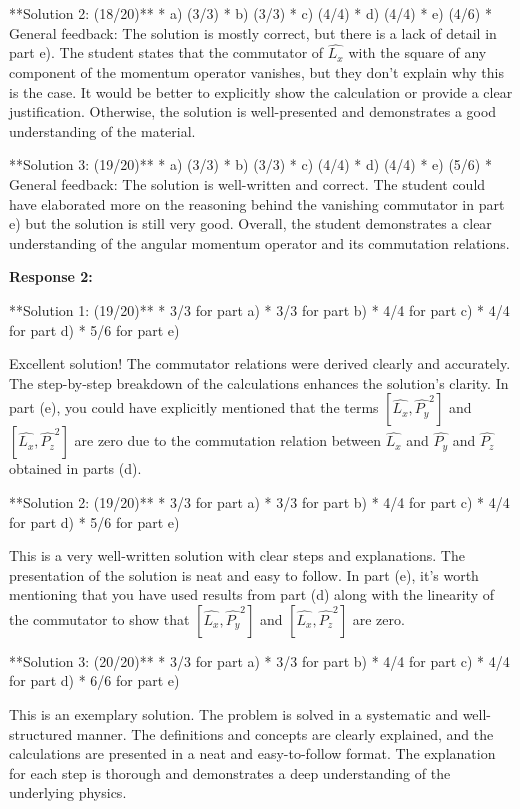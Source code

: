 \documentclass[a4paper,11pt]{article}
\begin{document}
**Solution 2: (18/20)**
* a) (3/3)
* b) (3/3)
* c) (4/4)
* d) (4/4)
* e) (4/6)
* General feedback: The solution is mostly correct, but there is a lack of detail in part e). The student states that the commutator of \( \hat{L_{x}} \) with the square of any component of the momentum operator vanishes, but they don't explain why this is the case. It would be better to explicitly show the calculation or provide a clear justification. Otherwise, the solution is well-presented and demonstrates a good understanding of the material.

**Solution 3: (19/20)**
* a) (3/3)
* b) (3/3)
* c) (4/4)
* d) (4/4)
* e) (5/6)
* General feedback: The solution is well-written and correct. The student could have elaborated more on the reasoning behind the vanishing commutator in part e) but the solution is still very good. Overall, the student demonstrates a clear understanding of the angular momentum operator and its commutation relations.

\bigskip    
\textbf{Response 2:}

**Solution 1: (19/20)**
* 3/3 for part a)
* 3/3 for part b)
* 4/4 for part c)
* 4/4 for part d)
* 5/6 for part e)

Excellent solution! The commutator relations were derived clearly and accurately. The step-by-step breakdown of the calculations enhances the solution's clarity. In part (e), you could have explicitly mentioned that the terms \( [\hat{L_x}, \hat{P_y}^2] \) and \( [\hat{L_x}, \hat{P_z}^2] \) are zero due to the commutation relation between \( \hat{L_x} \) and \( \hat{P_y} \) and \( \hat{P_z} \) obtained in parts (d).

**Solution 2: (19/20)**
* 3/3 for part a)
* 3/3 for part b)
* 4/4 for part c)
* 4/4 for part d)
* 5/6 for part e)

This is a very well-written solution with clear steps and explanations. The presentation of the solution is neat and easy to follow. In part (e), it's worth mentioning that you have used results from part (d) along with the linearity of the commutator to show that \( [\hat{L_x}, \hat{P_y}^2] \) and \( [\hat{L_x}, \hat{P_z}^2] \) are zero.

**Solution 3: (20/20)**
* 3/3 for part a)
* 3/3 for part b)
* 4/4 for part c)
* 4/4 for part d)
* 6/6 for part e)

This is an exemplary solution. The problem is solved in a systematic and well-structured manner. The definitions and concepts are clearly explained, and the calculations are presented in a neat and easy-to-follow format. The explanation for each step is thorough and demonstrates a deep understanding of the underlying physics.
\end{document}
